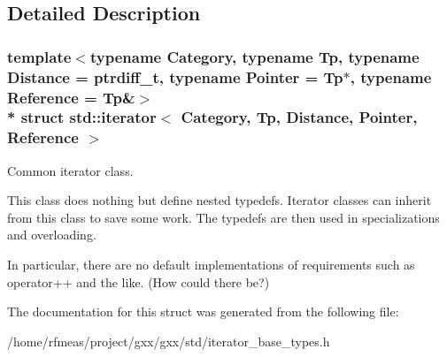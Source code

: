 \subsection{Detailed Description}
\subsubsection*{template$<$typename Category, typename Tp, typename Distance = ptrdiff\+\_\+t, typename Pointer = Tp$\ast$, typename Reference = Tp\&$>$\\*
struct std\+::iterator$<$ Category, Tp, Distance, Pointer, Reference $>$}

Common iterator class. 

This class does nothing but define nested typedefs. Iterator classes can inherit from this class to save some work. The typedefs are then used in specializations and overloading.

In particular, there are no default implementations of requirements such as {\ttfamily operator++} and the like. (How could there be?) 

The documentation for this struct was generated from the following file\+:\begin{DoxyCompactItemize}
\item 
/home/rfmeas/project/gxx/gxx/std/iterator\+\_\+base\+\_\+types.\+h\end{DoxyCompactItemize}
